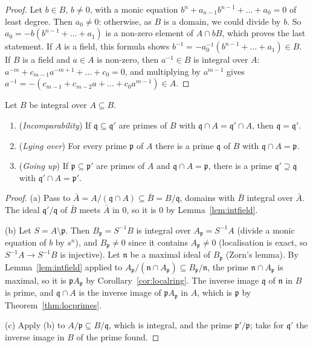 \begin{proof}
Let $b\in B$, $b\ne0$, with a monic equation $b^n+a_{n-1}b^{n-1}+\dots+a_0=0$ of least degree. Then $a_0\ne0$: otherwise, as $B$ is a domain, we could divide by $b$. So $a_0=-b(b^{n-1}+\dots+a_1)$ is a non-zero element of $A\cap bB$, which proves
the last statement. If $A$ is a field, this formula shows $b^{-1}=-a_0^{-1}(b^{n-1}+\dots+a_1)\in B$. If $B$ is a field and $a\in A$ is non-zero, then $a^{-1}\in B$ is integral over $A$: $a^{-m}+c_{m-1}a^{-m+1}+\dots+c_0=0$, and multiplying by $a^{m-1}$
gives $a^{-1}=-(c_{m-1}+c_{m-2}a+\dots+c_0a^{m-1})\in A$.
\end{proof}

\begin{theorem}\label{thm:goingup}
Let $B$ be integral over $A\subseteq B$.
\begin{enumerate}[label=(\alph*)]
\item (\emph{Incomparability}) If $\mathfrak q\subseteq\mathfrak q'$ are primes of $B$ with $\mathfrak q\cap A=\mathfrak q'\cap A$, then $\mathfrak q=\mathfrak q'$.
\item (\emph{Lying over}) For every prime $\mathfrak p$ of $A$ there is a prime $\mathfrak q$ of $B$ with $\mathfrak q\cap A=\mathfrak p$.
\item (\emph{Going up}) If $\mathfrak p\subseteq\mathfrak p'$ are primes of $A$ and $\mathfrak q\cap A=\mathfrak p$, there is a prime $\mathfrak q'\supseteq\mathfrak q$ with $\mathfrak q'\cap A=\mathfrak p'$.
\end{enumerate}
\end{theorem}

\begin{proof}
(a) Pass to $\bar A=A/(\mathfrak q\cap A)\subseteq\bar B=B/\mathfrak q$, domains with $\bar B$ integral over $\bar A$. The ideal $\mathfrak q'/\mathfrak q$ of $\bar B$ meets $\bar A$ in $0$, so it is $0$ by Lemma~\ref{lem:intfield}.

(b) Let $S=A\setminus\mathfrak p$. Then $B_{\mathfrak p}=S^{-1}B$ is integral over $A_{\mathfrak p}=S^{-1}A$ (divide a monic equation of $b$ by $s^n$), and $B_{\mathfrak p}\ne0$ since it contains $A_{\mathfrak p}\ne0$ (localisation is exact, so
$S^{-1}A\to S^{-1}B$ is injective). Let $\mathfrak n$ be a maximal ideal of $B_{\mathfrak p}$ (Zorn's lemma). By Lemma~\ref{lem:intfield} applied to $A_{\mathfrak p}/(\mathfrak n\cap A_{\mathfrak p})\subseteq B_{\mathfrak p}/\mathfrak n$, the prime
$\mathfrak n\cap A_{\mathfrak p}$ is maximal, so it is $\mathfrak pA_{\mathfrak p}$ by Corollary~\ref{cor:localring}. The inverse image $\mathfrak q$ of $\mathfrak n$ in $B$ is prime, and $\mathfrak q\cap A$ is the inverse image of
$\mathfrak pA_{\mathfrak p}$ in $A$, which is $\mathfrak p$ by Theorem~\ref{thm:locprimes}.

(c) Apply (b) to $A/\mathfrak p\subseteq B/\mathfrak q$, which is integral, and the prime $\mathfrak p'/\mathfrak p$; take for $\mathfrak q'$ the inverse image in $B$ of the prime found.
\end{proof}

